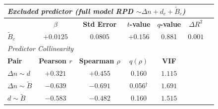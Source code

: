 \begin{table}[h!]
\begin{tabular}{lcccccc}
\midrule
\multicolumn{7}{l}{\textit{Excluded predictor (full model RPD $\sim \Delta n + d_c + \tilde{B}_c$)}} \\
\midrule
 & \textbf{$\beta$} & \textbf{Std Error} & \textbf{$t$-value} & \textbf{$q$-value} & \textbf{$\Delta R^2$} & \multicolumn{1}{l}{} \\
\midrule
    $\tilde{B}_c$ & $+0.0125$ & $0.0805$ & $+0.156$ & 0.881 & $0.001$ \\
\midrule
\multicolumn{7}{l}{\textit{Predictor Collinearity}} \\
\midrule
\textbf{Pair} & \textbf{Pearson $r$} & \textbf{Spearman $\rho$} & \textbf{$q(\rho)$} & \textbf{VIF} & \multicolumn{2}{l}{} \\
\midrule
    $\Delta n \sim d$ & $+0.321$ & $+0.455$ & 0.160 & $1.115$ & \\
    $\Delta n \sim \tilde{B}$ & $-0.639$ & $-0.691$ & 0.056$^{\dagger}$ & $1.691$ & \\
    $d \sim \tilde{B}$ & $-0.583$ & $-0.482$ & 0.160 & $1.515$ & \\
\bottomrule
\end{tabular}
\end{table}
